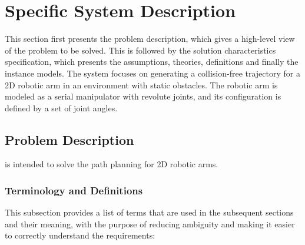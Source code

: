 \documentclass[12pt]{article}
\begin{document}
\section{Specific System Description}

This section first presents the problem description, which gives a high-level
view of the problem to be solved.  This is followed by the solution characteristics
specification, which presents the assumptions, theories, definitions and finally
the instance models. The system focuses on generating a collision-free trajectory for a 2D robotic arm in an environment with static obstacles. The robotic arm is modeled as a serial manipulator with revolute joints, and its configuration is defined by a set of joint angles.


\subsection{Problem Description} \label{Sec_pd}

\progname{} is intended to solve the path planning for 2D robotic arms.



\subsubsection{Terminology and  Definitions}


This subsection provides a list of terms that are used in the subsequent
sections and their meaning, with the purpose of reducing ambiguity and making it
easier to correctly understand the requirements:
\end{document}
